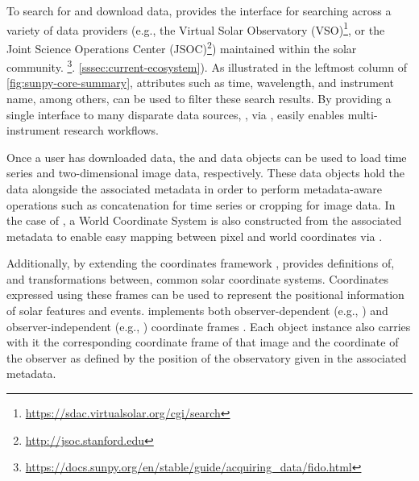 To search for and download data, \sunpypkg provides the \Fido interface for searching across a variety of data providers (e.g., the Virtual Solar Observatory (VSO)\footnote{\url{https://sdac.virtualsolar.org/cgi/search}}, or the Joint Science Operations Center (JSOC)\footnote{\url{http://jsoc.stanford.edu}}) maintained within the solar community.
\footnote{\url{https://docs.sunpy.org/en/stable/guide/acquiring_data/fido.html}}.
 \citep{sunpy_community2020} 
 \autoref{sssec:current-ecosystem}).
As illustrated in the leftmost column of \autoref{fig:sunpy-core-summary}, attributes such as time, wavelength, and instrument name, among others, can be used to filter these search results.
By providing a single interface to many disparate data sources, \sunpypkg, via \Fido, easily enables multi-instrument research workflows.

Once a user has downloaded data, the  and  data objects can be used to load time series and two-dimensional image data, respectively.
These data objects hold the data alongside the associated metadata in order to perform metadata-aware operations such as concatenation for time series or cropping for image data.
In the case of , a World Coordinate System \citep[WCS, e.g.,][]{greisen_representations_2002} is also constructed from the associated metadata to enable easy mapping between pixel and world coordinates via \astropypkg.

Additionally, by extending the \astropypkg coordinates framework \citep[see Section 3.3 of][for more details]{the_astropy_collaboration_astropy_2018}, \sunpypkg provides definitions of, and transformations between, common solar coordinate systems.
Coordinates expressed using these frames can be used to represent the positional information of solar features and events. \sunpypkg implements both observer-dependent (e.g., \hpc) and observer-independent (e.g., \hgs) coordinate frames \citep{thompson_coordinate_2006}.
Each  object instance also carries with it the corresponding coordinate frame of that image and the coordinate of the observer as defined by the position of the observatory given in the associated metadata.

